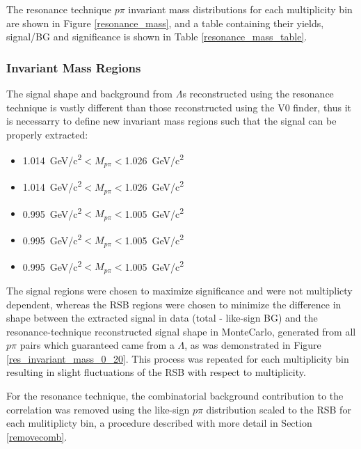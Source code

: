 \documentclass[ALICE,manyauthors]{ALICE_analysis_notes}
\begin{document}
The resonance technique $p\pi$ invariant mass distributions for each multiplicity bin are shown in Figure \ref{resonance_mass}, and a table containing their yields, signal/BG and significance is shown in Table \ref{resonance_mass_table}.


\subsubsection{Invariant Mass Regions}

The signal shape and background from $\Lambda$s reconstructed using the resonance technique is vastly different than those reconstructed using the V0 finder, thus it is necessarry to define new invariant mass regions such that the signal can be properly extracted:

\begin{itemize}
	\item {}  \SI{1.014}{GeV/c^2}$< M_{p\pi} < $\SI{1.026}{GeV/c^2}
	\item {}  \SI{1.014}{GeV/c^2}$< M_{p\pi} < $\SI{1.026}{GeV/c^2}
	\item  {}  \SI{0.995}{GeV/c^2}$< M_{p\pi} < $\SI{1.005}{GeV/c^2}
	\item  {}  \SI{0.995}{GeV/c^2}$< M_{p\pi} < $\SI{1.005}{GeV/c^2}
	\item  {}  \SI{0.995}{GeV/c^2}$< M_{p\pi} < $\SI{1.005}{GeV/c^2}
\end{itemize}

The signal regions were chosen to maximize significance and were not multiplicty dependent, whereas the RSB regions were chosen to minimize the difference in shape between the extracted signal in data (total - like-sign BG) and the resonance-technique reconstructed signal shape in MonteCarlo, generated from all $p\pi$ pairs which guaranteed came from a $\Lambda$, as was demonstrated in Figure \ref{res_invariant_mass_0_20}. This process was repeated for each multiplicity bin resulting in slight fluctuations of the RSB with respect to multiplicity.

For the resonance technique, the combinatorial background contribution to the correlation was removed using the like-sign $p\pi$ distribution scaled to the RSB for each mulitiplicty bin, a procedure described with more detail in Section \ref{removecomb}.
\end{document}
